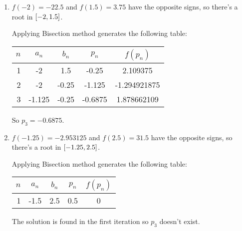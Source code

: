 \documentclass[../../../../Assignments.tex]{subfiles}
\begin{document}
\begin{solution}
    \begin{enumerate}[label = (\alph*)]
        \item \(f(-2) = \num{-22.5}\) and \(f(\num{1.5}) = \num{3.75}\) have the
            opposite signs, so there's a root in \(\interval{-2}{\num{1.5}}\).

            Applying Bisection method generates the following table:

            \begin{table}[H]
                \centering
                \begin{tabular}{r S[table-format=-1.3] S[table-format=-1.2] S[table-format=-1.4] S[table-format=-1.9]}
                    \toprule
                    \(n\)  &  {\(a_n\)}  &  {\(b_n\)}  &  {\(p_n\)}  &  {\(f(p_n)\)}  \\
                      &  -2         &   1.5       &  -0.25      &   2.109375     \\
                        2  &  -2         &  -0.25      &  -1.125     &  -1.294921875  \\
                        3  &  -1.125     &  -0.25      &  -0.6875    &   1.878662109  \\
                    \bottomrule
                \end{tabular}
            \end{table}

            So \(p_3 = \num{-0.6875}\).

        \item \(f(\num{-1.25}) = \num{-2.953125}\) and \(f(\num{2.5}) =
            \num{31.5}\) have the opposite signs, so there's a root in
            \(\interval{\num{-1.25}}{\num{2.5}}\).

            Applying Bisection method generates the following table:

            \begin{table}[H]
                \centering
                \begin{tabular}{r S[table-format=-1.1] S[table-format=1.1] S[table-format=1.1] S[table-format=1]}
                    \toprule
                    \(n\)  &  {\(a_n\)}  &  {\(b_n\)}  &  {\(p_n\)}  &  {\(f(p_n)\)}  \\
                       &  -1.5       &   2.5       &   0.5       &   0            \\
                    \bottomrule
                \end{tabular}
            \end{table}

            The solution is found in the first iteration so \(p_3\) doesn't
            exist.
    \end{enumerate}
\end{solution}
\end{document}
